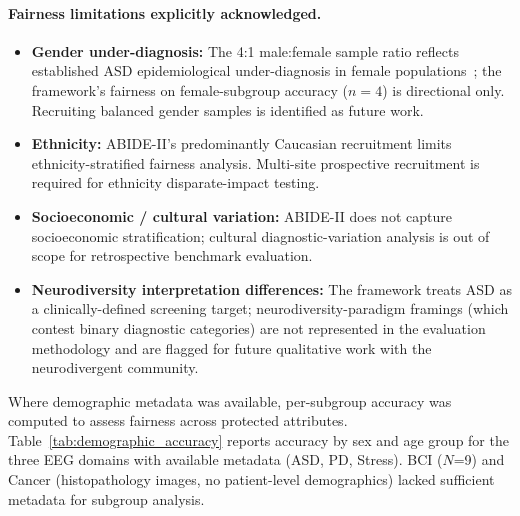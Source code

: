 \paragraph{Fairness limitations explicitly acknowledged.}
\begin{itemize}[leftmargin=*, itemsep=3pt]
    \item \textbf{Gender under-diagnosis:} The 4:1 male:female sample ratio reflects established ASD epidemiological under-diagnosis in female populations~\cite{loomes2017gender}; the framework's fairness on female-subgroup accuracy ($n=4$) is directional only. Recruiting balanced gender samples is identified as future work.
    \item \textbf{Ethnicity:} ABIDE-II's predominantly Caucasian recruitment limits ethnicity-stratified fairness analysis. Multi-site prospective recruitment is required for ethnicity disparate-impact testing.
    \item \textbf{Socioeconomic / cultural variation:} ABIDE-II does not capture socioeconomic stratification; cultural diagnostic-variation analysis is out of scope for retrospective benchmark evaluation.
    \item \textbf{Neurodiversity interpretation differences:} The framework treats ASD as a clinically-defined screening target; neurodiversity-paradigm framings (which contest binary diagnostic categories) are not represented in the evaluation methodology and are flagged for future qualitative work with the neurodivergent community.
\end{itemize}

\noindent Where demographic metadata was available, per-subgroup accuracy was computed to assess fairness across protected attributes. Table~\ref{tab:demographic_accuracy} reports accuracy by sex and age group for the three EEG domains with available metadata (ASD, PD, Stress). BCI ($N$=9) and Cancer (histopathology images, no patient-level demographics) lacked sufficient metadata for subgroup analysis.

